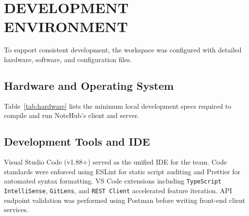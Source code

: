 \documentclass[12,Times new Roman,a4paper]{report}
\renewcommand{\arraystretch}{1.5} %
\begin{document}
\newpage
\section{DEVELOPMENT ENVIRONMENT}

To support consistent development, the workspace was configured with detailed hardware, software, and configuration files.

\subsection{Hardware and Operating System}

Table~\ref{tab:hardware} lists the minimum local development specs required to compile and run NoteHub's client and server.

\begin{table}[htbp]
\centering
\renewcommand{\arraystretch}{1.5}
\caption{Development Hardware and OS Specifications}
\label{tab:hardware}
\end{table}

\subsection{Development Tools and IDE}

Visual Studio Code (v1.88+) served as the unified IDE for the team. Code standards were enforced using ESLint for static script auditing and Prettier for automated syntax formatting. VS Code extensions including \texttt{TypeScript IntelliSense}, \texttt{GitLens}, and \texttt{REST Client} accelerated feature iteration. API endpoint validation was performed using Postman before writing front-end client services.
\end{document}
